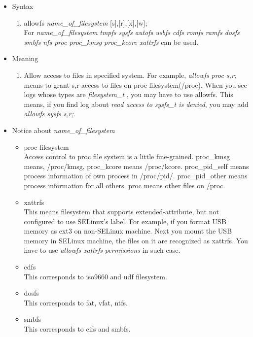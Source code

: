 \documentclass{article}
\begin{document}
\begin{itemize}
 \item Syntax
       \begin{enumerate}
	\item  allowfs {\it name\_of\_filesystem} [s],[r],[x],[w];\\
	       For {\it name\_of\_filesystem} {\it tmpfs sysfs autofs usbfs cdfs romfs
	       ramfs dosfs smbfs nfs proc proc\_kmsg proc\_kcore xattrfs} can be
	       used.
       \end{enumerate}      
 \item Meaning\\
       \begin{enumerate}

	\item Allow access to files in specified system. For example, {\it
	      allowfs proc s,r;} means to grant s,r access to files on proc
	      filesystem(/proc). When you see logs whose types are {\it
	      filesystem\_t }, you may have to use allowfs. This means, if you
	      find log about {\it read access to sysfs\_t is denied}, you may
	      add {\it allowfs sysfs s,r;}.
		
       \end{enumerate}
       

 \item Notice about {\it name\_of\_filesystem}
       \begin{itemize}
	\item proc filesystem\\
	      Access control to proc file system is a little
	      fine-grained. proc\_kmsg means, /proc/kmsg, proc\_kcore
	      means /proc/kcore. proc\_pid\_self means process information of
	      own process in /proc/pid/. proc\_pid\_other means process information for all
	      others. proc means other files on /proc. 
	\item xattrfs\\
	      This means filesystem that supports extended-attribute,
	      but not configured to use SELinux's label. For example, if
	      you format USB memory as ext3 on non-SELinux machine. Next
	      you mount the USB memory in SELinux machine, 
	      the files on it are recognized
	      as xattrfs. You have to use {\it allowfs xattrfs
	      permissions} in such case.
	\item cdfs\\
	      This corresponds to iso9660 and udf filesystem.
	\item dosfs\\
	      This corresponds to fat, vfat, ntfs.
	\item smbfs\\
	      This corresponds to cifs and smbfs.
       \end{itemize}
\end{itemize}
\end{document}
